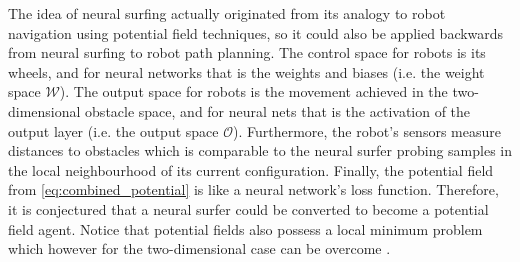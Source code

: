 The idea of neural surfing actually originated from its analogy to robot navigation using potential field techniques, so it could also be applied backwards from neural surfing to robot path planning.
The control space for robots is its wheels, and for neural networks that is the weights and biases (i.e. the weight space $\mathcal{W}$).
The output space for robots is the movement achieved in the two-dimensional obstacle space, and for neural nets that is the activation of the output layer (i.e. the output space $\mathcal{O}$).
Furthermore, the robot's sensors measure distances to obstacles which is comparable to the neural surfer probing samples in the local neighbourhood of its current configuration.
Finally, the potential field from \ref{eq:combined_potential} is like a neural network's loss function.
Therefore, it is conjectured that a neural surfer could be converted to become a potential field agent.
Notice that potential fields also possess a local minimum problem which however for the two-dimensional case can be overcome \cite{weir2006}.